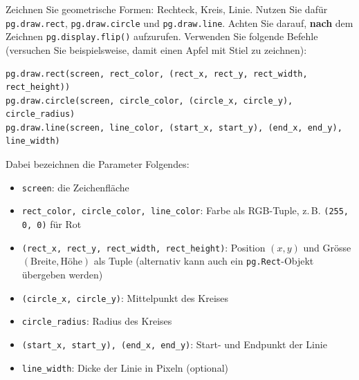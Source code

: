 \begin{myexercise}
    Zeichnen Sie geometrische Formen: Rechteck, Kreis, Linie. Nutzen Sie dafür \lstinline|pg.draw.rect|, \lstinline|pg.draw.circle| und \lstinline|pg.draw.line|. Achten Sie darauf, \textbf{nach} dem Zeichnen \lstinline|pg.display.flip()| aufzurufen. Verwenden Sie folgende Befehle (versuchen Sie beispielsweise, damit einen Apfel mit Stiel zu zeichnen):
    \begin{lstlisting}
pg.draw.rect(screen, rect_color, (rect_x, rect_y, rect_width, rect_height))
pg.draw.circle(screen, circle_color, (circle_x, circle_y), circle_radius)
pg.draw.line(screen, line_color, (start_x, start_y), (end_x, end_y), line_width)
\end{lstlisting}

    Dabei bezeichnen die Parameter Folgendes:
    \begin{itemize}
        \item \lstinline|screen|: die Zeichenfläche
        \item \lstinline|rect_color, circle_color, line_color|: Farbe als RGB-Tuple, z.\,B. \lstinline|(255, 0, 0)| für Rot
        \item {\sloppy \lstinline|(rect_x, rect_y, rect_width, rect_height)|: Position $(x,y)$ und Grösse $(\text{Breite},\text{Höhe})$ als Tuple (alternativ kann auch ein \lstinline|pg.Rect|-Objekt übergeben werden)\par}
        \item \lstinline|(circle_x, circle_y)|: Mittelpunkt des Kreises
        \item \lstinline|circle_radius|: Radius des Kreises
        \item \lstinline|(start_x, start_y), (end_x, end_y)|: Start- und Endpunkt der Linie
        \item \lstinline|line_width|: Dicke der Linie in Pixeln (optional)
    \end{itemize}
\end{myexercise}

